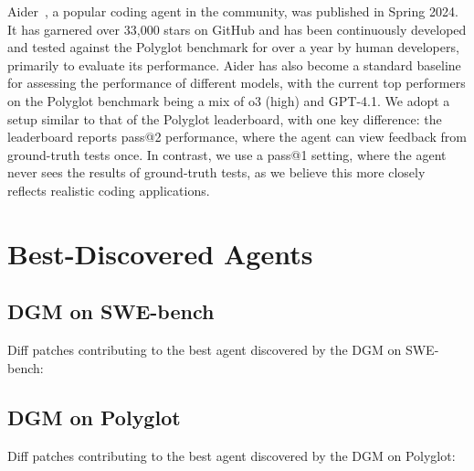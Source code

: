 Aider~\citep{aider2024}, a popular coding agent in the community, was published in Spring 2024. It has garnered over 33,000 stars on GitHub and has been continuously developed and tested against the Polyglot benchmark for over a year by human developers, primarily to evaluate its performance. Aider has also become a standard baseline for assessing the performance of different models, with the current top performers on the Polyglot benchmark being a mix of o3 (high) and GPT-4.1. We adopt a setup similar to that of the Polyglot leaderboard, with one key difference: the leaderboard reports pass@2 performance, where the agent can view feedback from ground-truth tests once. In contrast, we use a pass@1 setting, where the agent never sees the results of ground-truth tests, as we believe this more closely reflects realistic coding applications.

\section{Best-Discovered Agents}

\subsection{DGM on SWE-bench}
\label{app:best-agent-dgm}
Diff patches contributing to the best agent discovered by the DGM on SWE-bench:







\subsection{DGM on Polyglot}
\label{app:best-agent-dgm-polyglot}

Diff patches contributing to the best agent discovered by the DGM on Polyglot:





